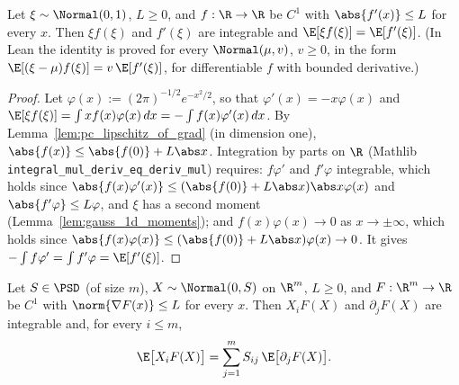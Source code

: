 \begin{lemma}\label{lem:psf_ibp_1d}
\leanok
{}
Let $\xi\sim\Normal(0,1)$, $L\ge0$, and $f : \R\to\R$ be $C^1$ with $\abs{f'(x)}\le L$ for
every $x$. Then $\xi f(\xi)$ and $f'(\xi)$ are integrable and $\E[\xi f(\xi)] = \E[f'(\xi)]$.
(In Lean the identity is proved for every $\Normal(\mu, v)$, $v \ge 0$, in the form
$\E[(\xi-\mu)f(\xi)] = v\,\E[f'(\xi)]$, for differentiable $f$ with bounded derivative.)
\end{lemma}

\begin{proof}
\leanok
{}
Let $\varphi(x) := (2\pi)^{-1/2}e^{-x^2/2}$, so that $\varphi'(x) = -x\varphi(x)$ and
$\E[\xi f(\xi)] = \int x f(x)\varphi(x)\,dx = -\int f(x)\varphi'(x)\,dx$. By
Lemma~\ref{lem:pc_lipschitz_of_grad} (in dimension one), $\abs{f(x)}\le\abs{f(0)}+L\abs x$.
Integration by parts on $\R$ (Mathlib \texttt{integral\_mul\_deriv\_eq\_deriv\_mul}) requires:
$f\varphi'$ and $f'\varphi$ integrable, which holds since
$\abs{f(x)\varphi'(x)}\le(\abs{f(0)}+L\abs x)\abs x\varphi(x)$ and $\abs{f'\varphi}\le L\varphi$,
and $\xi$ has a second moment (Lemma~\ref{lem:gauss_1d_moments}); and
$f(x)\varphi(x)\to 0$ as $x\to\pm\infty$, which holds since
$\abs{f(x)\varphi(x)}\le(\abs{f(0)}+L\abs x)\varphi(x)\to0$. It gives
$-\int f\varphi' = \int f'\varphi = \E[f'(\xi)]$.
\end{proof}

\begin{lemma}\label{lem:gauss_ibp}
\leanok
{}
Let $S \in \PSD$ (of size $m$), $X \sim \Normal(0,S)$ on $\R^m$, $L\ge0$, and
$F : \R^m\to\R$ be $C^1$ with $\norm{\nabla F(x)}\le L$ for every $x$. Then $X_iF(X)$ and
$\partial_jF(X)$ are integrable and, for every $i \le m$,
\[
  \E\big[X_i F(X)\big] = \sum_{j=1}^m S_{ij}\,\E\big[\partial_j F(X)\big].
\]
\end{lemma}

